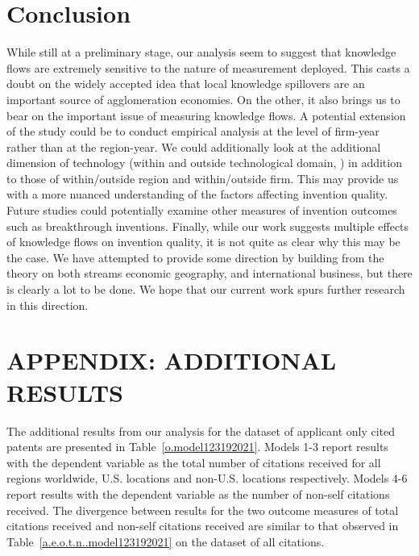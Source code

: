 \documentclass[12pt,letterpaper]{article}
\begin{document}
\section*{Conclusion}
While still at a preliminary stage, our analysis seem to suggest that knowledge flows are extremely sensitive to the nature of measurement deployed. This casts a doubt on the widely accepted idea that local knowledge spillovers are an important source of agglomeration economies. On the other, it also brings us to bear on the important issue of measuring knowledge flows. A potential extension of the study could be to conduct empirical analysis at the level of firm-year rather than at the region-year. We could additionally look at the additional dimension of technology (within and outside technological domain, \cite{Rosenkopf2001}) in addition to those of within/outside region and within/outside firm. This may provide us with a more nuanced understanding of the factors affecting invention quality. Future studies could potentially examine other measures of invention outcomes such as breakthrough inventions. Finally, while our work suggests multiple effects of knowledge flows on invention quality, it is not quite as clear why this may be the case. We have attempted to provide some direction by building from the theory on both streams economic geography, and international business, but there is clearly a lot to be done. We hope that our current work spurs further research in this direction.  

\renewcommand{\refname}{REFERENCES}
\singlespacing
 

\newpage

\appendix

\section{APPENDIX: ADDITIONAL RESULTS}


%


%
%

The additional results from our analysis for the dataset of applicant only cited patents are presented in Table~\ref{o.model123192021}. Models 1-3 report results with the dependent variable as the total number of citations received for all regions worldwide, U.S. locations and non-U.S. locations respectively. Models 4-6 report results with the dependent variable as the number of non-self citations received. The divergence between results for the two outcome measures of total citations received and non-self citations received are similar to that observed in Table~\ref{a.e.o.t.n..model123192021} on the dataset of all citations. \par
\end{document}
